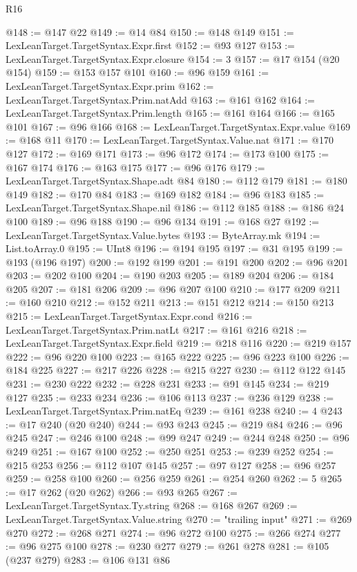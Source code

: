 \begin{lexlean}{R16}
\begin{coremodule}
@148 := @147 @22
@149 := @14 @84
@150 := @148 @149
@151 := LexLeanTarget.TargetSyntax.Expr.first
@152 := @93 @127
@153 := LexLeanTarget.TargetSyntax.Expr.closure
@154 := 3
@157 := @17 @154 (@20 @154)
@159 := @153 @157 @101
@160 := @96 @159
@161 := LexLeanTarget.TargetSyntax.Expr.prim
@162 := LexLeanTarget.TargetSyntax.Prim.natAdd
@163 := @161 @162
@164 := LexLeanTarget.TargetSyntax.Prim.length
@165 := @161 @164
@166 := @165 @101
@167 := @96 @166
@168 := LexLeanTarget.TargetSyntax.Expr.value
@169 := @168 @11
@170 := LexLeanTarget.TargetSyntax.Value.nat
@171 := @170 @127
@172 := @169 @171
@173 := @96 @172
@174 := @173 @100
@175 := @167 @174
@176 := @163 @175
@177 := @96 @176
@179 := LexLeanTarget.TargetSyntax.Shape.adt @84
@180 := @112 @179
@181 := @180 @149
@182 := @170 @84
@183 := @169 @182
@184 := @96 @183
@185 := LexLeanTarget.TargetSyntax.Shape.nil
@186 := @112 @185
@188 := @186 @24 @100
@189 := @96 @188
@190 := @96 @134
@191 := @168 @27
@192 := LexLeanTarget.TargetSyntax.Value.bytes
@193 := ByteArray.mk
@194 := List.toArray.{0}
@195 := UInt8
@196 := @194 @195
@197 := @31 @195
@199 := @193 (@196 @197)
@200 := @192 @199
@201 := @191 @200
@202 := @96 @201
@203 := @202 @100
@204 := @190 @203
@205 := @189 @204
@206 := @184 @205
@207 := @181 @206
@209 := @96 @207 @100
@210 := @177 @209
@211 := @160 @210
@212 := @152 @211
@213 := @151 @212
@214 := @150 @213
@215 := LexLeanTarget.TargetSyntax.Expr.cond
@216 := LexLeanTarget.TargetSyntax.Prim.natLt
@217 := @161 @216
@218 := LexLeanTarget.TargetSyntax.Expr.field
@219 := @218 @116
@220 := @219 @157
@222 := @96 @220 @100
@223 := @165 @222
@225 := @96 @223 @100
@226 := @184 @225
@227 := @217 @226
@228 := @215 @227
@230 := @112 @122 @145
@231 := @230 @222
@232 := @228 @231
@233 := @91 @145
@234 := @219 @127
@235 := @233 @234
@236 := @106 @113
@237 := @236 @129
@238 := LexLeanTarget.TargetSyntax.Prim.natEq
@239 := @161 @238
@240 := 4
@243 := @17 @240 (@20 @240)
@244 := @93 @243
@245 := @219 @84
@246 := @96 @245
@247 := @246 @100
@248 := @99 @247
@249 := @244 @248
@250 := @96 @249
@251 := @167 @100
@252 := @250 @251
@253 := @239 @252
@254 := @215 @253
@256 := @112 @107 @145
@257 := @97 @127
@258 := @96 @257
@259 := @258 @100
@260 := @256 @259
@261 := @254 @260
@262 := 5
@265 := @17 @262 (@20 @262)
@266 := @93 @265
@267 := LexLeanTarget.TargetSyntax.Ty.string
@268 := @168 @267
@269 := LexLeanTarget.TargetSyntax.Value.string
@270 := "trailing input"
@271 := @269 @270
@272 := @268 @271
@274 := @96 @272 @100
@275 := @266 @274
@277 := @96 @275 @100
@278 := @230 @277
@279 := @261 @278
@281 := @105 (@237 @279)
@283 := @106 @131 @86

\end{coremodule}
\end{lexlean}
